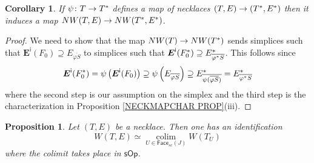 \documentclass[a4paper,10pt
,draft
]{article}%
\numberwithin{equation}{section}
\numberwithin{figure}{section}
\newtheorem{proposition}[equation]{Proposition}%
\newtheorem{corollary}[equation]{Corollary}%
\theoremstyle{definition} %
\DeclareMathOperator{\colim}{colim}%
\newcommand{\1}{\ensuremath{\mathbbm 1}}%
\begin{document}
\begin{corollary}
	If $\psi \colon T \to T^{\**}$
	defines a map of necklaces
	$(T,E) \to (T^{\**},E^{\**})$
	then 
	it induces a map
	$NW(T,E) \to NW(T^{\**},E^{\**})$.
\end{corollary}


\begin{proof}
	We need to show that the 
	map
	$NW(T) \to NW(T^{\**})$
	sends simplices such that
	$\boldsymbol{E}^{\mathsf{i}}(F_0) \supseteq 
	E_{\overline{\varphi S}}$
	to simplices such that
	$\boldsymbol{E}^{\mathsf{i}}(F^{\**}_0) \supseteq 
	E^{\**}_{\overline{\varphi^{\**} S}}$.
	This follows since
\[
\boldsymbol{E}^{\mathsf{i}}(F^{\**}_0)
	=
\psi \left(\boldsymbol{E}^{\mathsf{i}}(F_0)\right)
	\supseteq
\psi \left( E_{\overline{\varphi S}} \right)
	\supseteq
E^{\**}_{\overline{\psi (\overline{\varphi S})}}
	=
E^{\**}_{\overline{\varphi^{\**} S}}
\]
where the second step is our assumption on the simplex and
the third step is the characterization in 
Proposition \ref{NECKMAPCHAR PROP}(iii).
\end{proof}




\begin{proposition}\label{NECKCOL PROP}
Let $(T,E)$ be a necklace.
Then one has an identification
\begin{equation}\label{NECKCOL EQ}
W(T,E)
\simeq 
\underset{U \in \mathsf{Face}_{sc}(J)}{\colim}
W(T_U)
\end{equation}
where the colimit takes place 
in $\mathsf{sOp}$.
\end{proposition}
\end{document}
